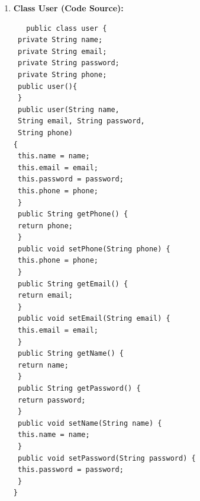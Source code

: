 \begin{enumerate}
\begin{lstlisting}
 if(imageUri != null)
 {
 uploadtofirebase(imageUri);
 }
 else {
 Toast.makeText(posting.this, "please select image",
Toast.LENGTH_SHORT).show();
 }}
 //refr.push().setValue(f1);
 //Toast.makeText(this,"sucsses",Toast.LENGTH_LONG)
 .show();
 }
 });
 }
 @Override
 protected void onActivityResult(int requestCode,
 int resultCode,
@Nullable @org.jetbrains.annotations.Nullable Intent data) {
 super.onActivityResult(requestCode, resultCode, data);
 if(requestCode==2 && resultCode==RESULT_OK && data!=null)
 {
 imageUri=data.getData();
 pic.setImageURI(imageUri);
 }
 }
 private void uploadtofirebase(Uri uri){
 StorageReference
fileref=reference.child(System.currentTimeMillis()
+""+getFileExtension(u
ri));
 fileref.putFile(uri).addOnSuccessListener(new
OnSuccessListener<UploadTask.TaskSnapshot>() {
 @Override
 public void onSuccess(UploadTask.TaskSnapshot taskSnapshot) {
 fileref.getDownloadUrl().addOnSuccessListener(new
OnSuccessListener<Uri>() {
 @Override
public void onSuccess(Uri uri) {
 Toast.makeText(posting.this,"uploaded
sucsses",Toast.LENGTH_LONG).show();
 category cc = new
category(txt1.getText().toString(),uri
.toString(),Integer.parseInt(txt3.g
etText().toString()),Integer
.parseInt(txt2.getText().toString()),txtpho.
getText().toString());
 String modelId=refr.push().getKey();
 String
hh=refr.child(txt1.getText().toString()).getKey();
 refr.child(hh).setValue(cc);
 progressBar2.setVisibility(View.GONE);
 }
 });
 }
 }).addOnProgressListener(new
OnProgressListener<UploadTask.TaskSnapshot>() {
 @Override
 public void onProgress(@NonNull @NotNull
UploadTask.TaskSnapshot snapshot) {
 progressBar2.setVisibility(View.VISIBLE);
 }
 }).addOnFailureListener(new OnFailureListener() {
 @Override
 public void onFailure(@NonNull @NotNull Exception e) {
 Toast.makeText(posting.this,"uploaded
failed"+e.getMessage(),Toast.LENGTH_LONG).show();
 }
 });
 }
 private String getFileExtension(Uri mUri)
 {
 ContentResolver cr=getContentResolver();
 MimeTypeMap mime=MimeTypeMap.getSingleton();
 return mime.getExtensionFromMimeType(cr.getType(mUri));
 }
}
  \end{lstlisting}
  
  
   \newpage
  \item \textbf{Class User  (Code Source):}
  \begin{lstlisting}
   public class user {
 private String name;
 private String email;
 private String password;
 private String phone;
 public user(){
 }
 public user(String name,
 String email, String password,
 String phone)
{
 this.name = name;
 this.email = email;
 this.password = password;
 this.phone = phone;
 }
 public String getPhone() {
 return phone;
 }
 public void setPhone(String phone) {
 this.phone = phone;
 }
 public String getEmail() {
 return email;
 }
 public void setEmail(String email) {
 this.email = email;
 }
 public String getName() {
 return name;
 }
 public String getPassword() {
 return password;
 }
 public void setName(String name) {
 this.name = name;
 }
 public void setPassword(String password) {
 this.password = password;
 }
}
  \end{lstlisting}
  

\end{enumerate}

